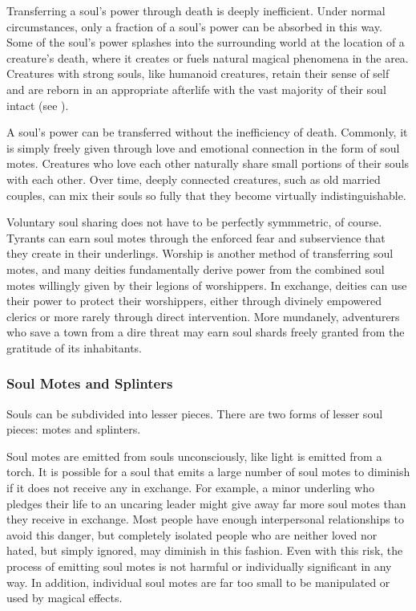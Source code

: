             Transferring a soul's power through death is deeply inefficient.
            Under normal circumstances, only a fraction of a soul's power can be absorbed in this way.
            Some of the soul's power splashes into the surrounding world at the location of a creature's death, where it creates or fuels natural magical phenomena in the area.
            Creatures with strong souls, like humanoid creatures, retain their sense of self and are reborn in an appropriate afterlife with the vast majority of their soul intact (see ).

            A soul's power can be transferred without the inefficiency of death.
            Commonly, it is simply freely given through love and emotional connection in the form of soul motes.
            Creatures who love each other naturally share small portions of their souls with each other.
            Over time, deeply connected creatures, such as old married couples, can mix their souls so fully that they become virtually indistinguishable.

            Voluntary soul sharing does not have to be perfectly symmmetric, of course.
            Tyrants can earn soul motes through the enforced fear and subservience that they create in their underlings.
            Worship is another method of transferring soul motes, and many deities fundamentally derive power from the combined soul motes willingly given by their legions of worshippers.
            In exchange, deities can use their power to protect their worshippers, either through divinely empowered clerics or more rarely through direct intervention.
            More mundanely, adventurers who save a town from a dire threat may earn soul shards freely granted from the gratitude of its inhabitants.

        \subsubsection{Soul Motes and Splinters}
            Souls can be subdivided into lesser pieces.
            There are two forms of lesser soul pieces: motes and splinters.

            Soul motes are emitted from souls unconsciously, like light is emitted from a torch.
            It is possible for a soul that emits a large number of soul motes to diminish if it does not receive any in exchange.
            For example, a minor underling who pledges their life to an uncaring leader might give away far more soul motes than they receive in exchange.
            Most people have enough interpersonal relationships to avoid this danger, but completely isolated people who are neither loved nor hated, but simply ignored, may diminish in this fashion.
            Even with this risk, the process of emitting soul motes is not harmful or individually significant in any way.
            In addition, individual soul motes are far too small to be manipulated or used by magical effects.


